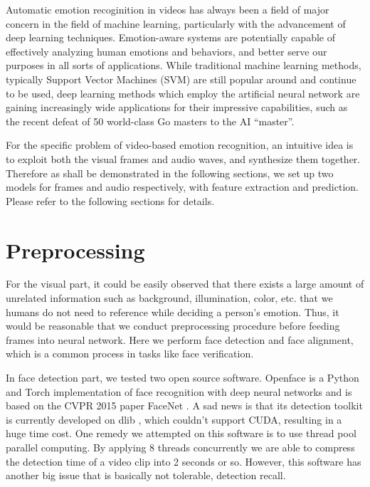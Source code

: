 \documentclass[10pt,twocolumn,letterpaper]{article}
\begin{document}
Automatic emotion recoginition in videos has always been a field of major concern in the field of machine learning, particularly with the advancement of deep learning techniques. Emotion-aware systems are potentially capable of effectively analyzing human emotions and behaviors, and better serve our purposes in all sorts of applications.
While traditional machine learning methods, typically Support Vector Machines (SVM) are still popular around and continue to be used, deep learning methods which employ the artificial neural network are gaining increasingly wide applications for their impressive capabilities, such as the recent defeat of 50 world-class Go masters to the AI ``master''.

For the specific problem of video-based emotion recognition, an intuitive idea is to exploit both the visual frames and audio waves, and synthesize them together. Therefore as shall be demonstrated in the following sections, we set up two models for frames and audio respectively, with feature extraction and prediction. Please refer to the following sections for details. 

\section{Preprocessing}

For the visual part, it could be easily observed that there exists a large amount of unrelated information such as background, illumination, color, etc. that we humans do not need to reference while deciding a person's emotion. Thus, it would be reasonable that we conduct preprocessing procedure before feeding frames into neural network. Here we perform face detection and face alignment, which is a common process in tasks like face verification.

In face detection part, we tested two open source software. Openface \cite{amos2016openface} is a Python and Torch implementation of face recognition with deep neural networks and is based on the CVPR 2015 paper FaceNet \cite{schroff2015facenet}. A sad news is that its detection toolkit is currently developed on dlib \cite{king2009dlib}, which couldn't support CUDA, resulting in a huge time cost. One remedy we attempted on this software is to use thread pool parallel computing. By applying 8 threads concurrently we are able to compress the detection time of a video clip into 2 seconds or so. However, this software has another big issue that is basically not tolerable, detection recall.
\end{document}
